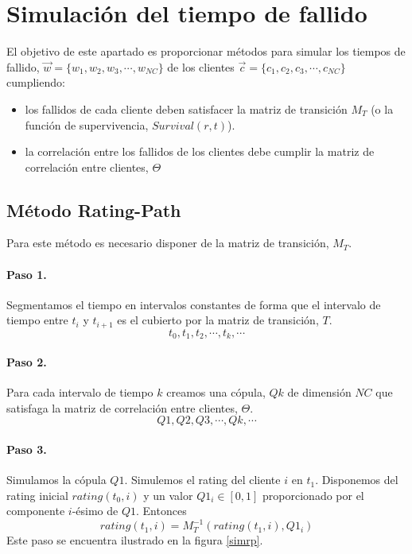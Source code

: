 
\section{Simulaci\'on del tiempo de fallido}

El objetivo de este apartado es proporcionar m\'etodos para simular los
tiempos de fallido, $\vec{w} = \{w_1,w_2,w_3,\cdots,w_{NC}\}$ de los clientes
$\vec{c} = \{c_1,c_2,c_3,\cdots,c_{NC}\}$ cumpliendo:
\begin{itemize}
\item los fallidos de cada cliente deben satisfacer la matriz de transici\'on $M_T$
(o la funci\'on de supervivencia, $Survival(r,t)$).
\item la correlaci\'on entre los fallidos de los clientes debe cumplir la matriz
de correlaci\'on entre clientes, $\Theta$
\end{itemize}

\subsection{M\'etodo Rating-Path}

Para este m\'etodo es necesario disponer de la matriz de transici\'on, $M_T$.

\paragraph{Paso 1.} Segmentamos el tiempo en intervalos constantes de forma que
el intervalo de tiempo entre $t_i$ y $t_{i+1}$ es el cubierto por la matriz de
transici\'on, $T$.
\begin{displaymath}
t_0,t_1,t_2,\cdots,t_k, \cdots
\end{displaymath}

\paragraph{Paso 2.} Para cada intervalo de tiempo $k$ creamos una c\'opula,
$Qk$ de dimensi\'on $NC$ que satisfaga la matriz de correlaci\'on entre
clientes, $\Theta$.
\begin{displaymath}
Q1, Q2, Q3, \cdots, Qk, \cdots
\end{displaymath}

\paragraph{Paso 3.} Simulamos la c\'opula $Q1$. Simulemos el rating del cliente
$i$ en $t_1$. Disponemos del rating inicial $rating(t_0,i)$ y un valor $Q1_i \in [0,1]$
proporcionado por el componente $i$-\'esimo de $Q1$. Entonces
\begin{displaymath}
rating(t_1,i) = M_T^{-1}(rating(t_1,i),Q1_i)
\end{displaymath}
Este paso se encuentra ilustrado en la figura \ref{simrp}.

